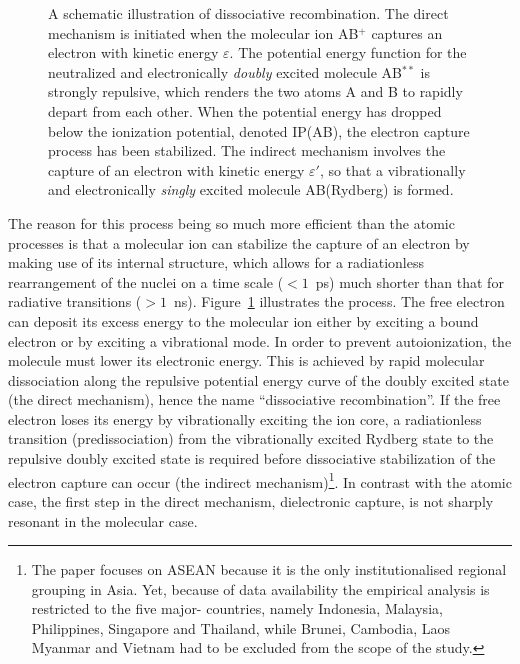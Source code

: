\documentclass{ws-rv9x6}
\begin{document}
\begin{figure}[th]		%
\centerline{}
\vspace*{8pt}
\caption{A schematic illustration of dissociative recombination. The
direct mechanism is initiated when the molecular ion AB$^+$ captures
an electron with kinetic energy $\varepsilon$. The potential energy
function for the neutralized and electronically {\it doubly\/} excited
molecule AB$^{**}$ is strongly repulsive, which renders the two atoms
A and B to rapidly depart from each other. When the potential energy 
has dropped below the ionization potential, denoted IP(AB), the
electron capture process has been stabilized. The indirect mechanism
involves the capture of an electron with kinetic energy
$\varepsilon'$, so that a vibrationally and electronically {\it
singly\/} excited molecule AB(Rydberg) is formed. \label{fig1}}
\end{figure}

The reason for this process being so much more efficient than the
atomic processes is that a molecular ion can stabilize the capture of
an electron by making use of its internal structure, which allows for
a radiationless rearrangement of the nuclei on a time scale ($<1$~ps)
much shorter than that for radiative transitions ($>1$~ns).  
Figure~\ref{fig1} illustrates the process. The free electron can
deposit its excess energy to the molecular ion either by exciting a
bound electron or by exciting a vibrational mode. In order to prevent
autoionization, the molecule must lower its
electronic energy. This is achieved by rapid mole\-cular dissociation
along the repulsive potential energy curve of the doubly excited state
(the direct mechanism), hence the name ``dissociative
recombination''. If the free electron loses its energy by vibrationally
exciting the ion core, a radiationless transition (predissociation)
from the vibrationally excited Rydberg state to the repulsive doubly
excited state is required before dissociative stabilization of the
electron capture can occur (the indirect mechanism)\footnote{The paper
focuses on ASEAN because it is the only institutionalised regional
grouping in Asia. Yet, because of data availability the empirical
analysis is restricted to the five major- countries, namely Indonesia,
Malaysia, Philippines, Singapore and Thailand, while Brunei, Cambodia,
Laos Myanmar and Vietnam had to be excluded from the scope of the 
study.}. In contrast with the atomic case, the first step in the
direct mechanism, dielectronic capture, is not sharply resonant in the
molecular case.
\end{document}
